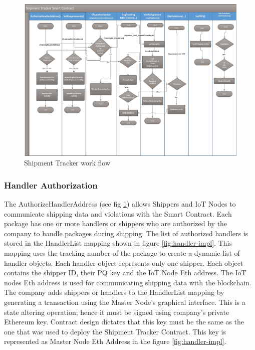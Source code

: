 \clearpage   
\begin{figure}[h]
	\centering
    \includegraphics[width=175mm,scale=1]{figs/sc-workflow}
	\caption{Shipment Tracker work flow}
	\label{fig:sc-workflow} 
\end{figure}

\subsubsection{Handler Authorization} \label{AuthHandlers}
The AuthorizeHandlerAddress (see fig \ref{fig:sc-workflow}) allows Shippers and IoT Nodes to communicate shipping data and violations with the Smart Contract. Each package has one or more handlers or shippers who are authorized by the company to handle packages during shipping. The list of authorized handlers is stored in the HandlerList mapping shown in figure \ref{fig:handler-impl}. This mapping uses the tracking number of the package to create a dynamic list of handler objects. Each handler object represents only one shipper. Each object contains the shipper ID, their PQ key and the IoT Node Eth address. The IoT nodes Eth address is used for communicating shipping data with the blockchain. The company adds shippers or handlers to the HandlerList mapping by generating a transaction using the Master Node’s graphical interface. This is a state altering operation; hence it must be signed using company’s private Ethereum key. Contract design dictates that this key must be the same as the one that was used to deploy the Shipment Tracker Contract. This key is represented as Master Node Eth Address in the figure \ref{fig:handler-impl}. 
\clearpage


